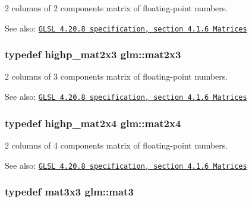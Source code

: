 2 columns of 2 components matrix of floating-point numbers.

\begin{Desc}
\item[See also:]\href{http://www.opengl.org/registry/doc/GLSLangSpec.4.20.8.pdf}{\tt GLSL 4.20.8 specification, section 4.1.6 Matrices} \end{Desc}
\hypertarget{group__core__types_gea02797b8231f6dd9380345f6ff12155}{
\subsubsection[mat2x3]{\setlength{\rightskip}{0pt plus 5cm}typedef highp\_\-mat2x3 {\bf glm::mat2x3}}}
\label{group__core__types_gea02797b8231f6dd9380345f6ff12155}


2 columns of 3 components matrix of floating-point numbers.

\begin{Desc}
\item[See also:]\href{http://www.opengl.org/registry/doc/GLSLangSpec.4.20.8.pdf}{\tt GLSL 4.20.8 specification, section 4.1.6 Matrices} \end{Desc}
\hypertarget{group__core__types_ga9bfb36efaf88ecad32369ec8a01d901}{
\subsubsection[mat2x4]{\setlength{\rightskip}{0pt plus 5cm}typedef highp\_\-mat2x4 {\bf glm::mat2x4}}}
\label{group__core__types_ga9bfb36efaf88ecad32369ec8a01d901}


2 columns of 4 components matrix of floating-point numbers.

\begin{Desc}
\item[See also:]\href{http://www.opengl.org/registry/doc/GLSLangSpec.4.20.8.pdf}{\tt GLSL 4.20.8 specification, section 4.1.6 Matrices} \end{Desc}
\hypertarget{group__core__types_gdfaff2a7dce5cbf4e77a47ecea42ac5b}{
\subsubsection[mat3]{\setlength{\rightskip}{0pt plus 5cm}typedef mat3x3 {\bf glm::mat3}}}
\label{group__core__types_gdfaff2a7dce5cbf4e77a47ecea42ac5b}



